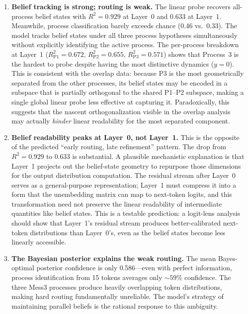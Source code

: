\documentclass[11pt]{article}
\begin{document}
\begin{enumerate}
    \item \textbf{Belief tracking is strong; routing is weak.} The linear probe recovers all-process belief states with $R^2 = 0.929$ at Layer~0 and $0.633$ at Layer~1. Meanwhile, process classification barely exceeds chance (0.46 vs.\ 0.33). The model tracks belief states under all three process hypotheses simultaneously without explicitly identifying the active process. The per-process breakdown at Layer~1 ($R^2_{\text{P1}} = 0.672$, $R^2_{\text{P2}} = 0.655$, $R^2_{\text{P3}} = 0.571$) shows that Process~3 is the hardest to probe despite having the most distinctive dynamics ($y=0$). This is consistent with the overlap data: because P3 is the most geometrically separated from the other processes, its belief states may be encoded in a subspace that is partially orthogonal to the shared P1--P2 subspace, making a single global linear probe less effective at capturing it. Paradoxically, this suggests that the nascent orthogonalization visible in the overlap analysis may actually \emph{hinder} linear readability for the most separated component.

    \item \textbf{Belief readability peaks at Layer~0, not Layer~1.} This is the opposite of the predicted ``early routing, late refinement'' pattern. The drop from $R^2 = 0.929$ to $0.633$ is substantial. A plausible mechanistic explanation is that Layer~1 projects out the belief-state geometry to repurpose those dimensions for the output distribution computation. The residual stream after Layer~0 serves as a general-purpose representation; Layer~1 must compress it into a form that the unembedding matrix can map to next-token logits, and this transformation need not preserve the linear readability of intermediate quantities like belief states. This is a testable prediction: a logit-lens analysis should show that Layer~1's residual stream produces better-calibrated next-token distributions than Layer~0's, even as the belief states become less linearly accessible.

    \item \textbf{The Bayesian posterior explains the weak routing.} The mean Bayes-optimal posterior confidence is only 0.586---even with perfect information, process identification from 15 tokens averages only ${\sim}59\%$ confidence. The three Mess3 processes produce heavily overlapping token distributions, making hard routing fundamentally unreliable. The model's strategy of maintaining parallel beliefs is the rational response to this ambiguity.
\end{enumerate}
\end{document}
